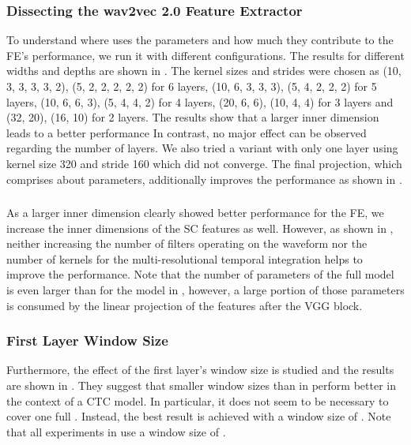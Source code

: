 \documentclass{INTERSPEECH2023}
\begin{document}
\subsubsection{Dissecting the wav2vec 2.0 Feature Extractor}
\label{sec:w2v_components}
To understand where \wvtwo uses the parameters and how much they contribute to the \gls{FE}'s performance, we run it with different configurations.
The results for different widths and depths are shown in .
The kernel sizes and strides were chosen as (10, 3, 3, 3, 3, 2), (5, 2, 2, 2, 2, 2) for 6 layers, (10, 6, 3, 3, 3), (5, 4, 2, 2, 2) for 5 layers, (10, 6, 6, 3), (5, 4, 4, 2) for 4 layers, (20, 6, 6), (10, 4, 4) for 3 layers and (32, 20), (16, 10) for 2 layers.
The results show that a larger inner dimension leads to a better performance
In contrast, no major effect can be observed regarding the number of layers.
We also tried a variant with only one layer using kernel size 320 and stride 160 which did not converge.
The final projection, which comprises about  parameters, additionally improves the performance as shown in .



\subsubsection{}
\label{sec:scf_size}
As a larger inner dimension clearly showed better performance for the \wvtwo \gls{FE}, we increase the inner dimensions of the \gls{SC} features as well.
However, as shown in , neither increasing the number of filters operating on the waveform nor the number of kernels for the multi-resolutional temporal integration helps to improve the performance.
Note that the number of parameters of the full model is even larger than for the \wvtwo model in , however, a large portion of those parameters is consumed by the linear projection of the features after the \gls{VGG} block.


\subsubsection{First Layer Window Size}
\label{sec:scf_first_window}
Furthermore, the effect of the first layer's window size is studied and the results are shown in .
They suggest that smaller window sizes than in \cite{tuske2018:waveform} perform better in the context of a \conformer \gls{CTC} model.
In particular, it does not seem to be necessary to cover one full .
Instead, the best result is achieved with a window size of .
Note that all experiments in  use a window size of .

\end{document}
